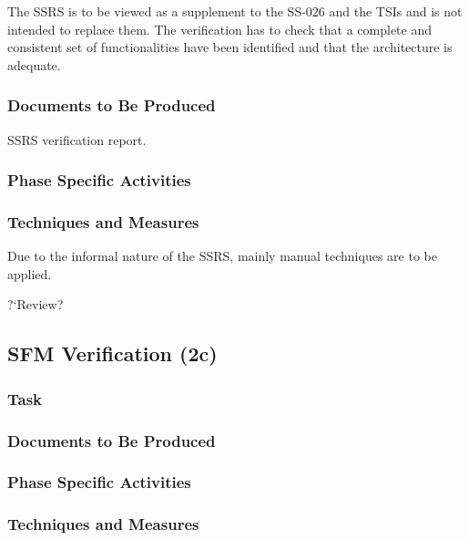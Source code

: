 \documentclass{template/openetcs_report}
\newcommand{\qq}[1]{?`#1?}
\begin{document}
The SSRS is to be viewed as a supplement to the SS-026 and the
TSIs and is not intended to replace them. The verification has to
check that a complete and consistent set of functionalities have been
identified and that the architecture is adequate. 



\subsubsection{Documents to Be Produced}
\label{sec:ssrs-verif-docum-be-prod}

SSRS verification report.

\subsubsection{Phase Specific Activities}
\label{sec:ssrs-verif-phase-spec-activ}

\subsubsection{Techniques and Measures}
\label{sec:ssrs-verif-techniques-measures}

 Due to the informal
nature of the SSRS, mainly manual techniques are to be applied.

\qq{Review}



\subsection{SFM Verification (2c)}
\label{sec:sfm-verif-verification}

\subsubsection{Task}
\label{sec:sfm-verif-task}

\subsubsection{Documents to Be Produced}
\label{sec:sfm-verif-docum-be-prod}

\subsubsection{Phase Specific Activities}
\label{sec:sfm-verif-phase-spec-activ}

\subsubsection{Techniques and Measures}
\label{sec:sfm-verif-techniques-measures}
\end{document}
